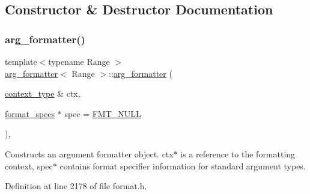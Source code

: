 \subsection{Constructor \& Destructor Documentation}
\mbox{\label{classarg__formatter_a487efe4918c55106464196727524057a}} 
\subsubsection{\texorpdfstring{arg\+\_\+formatter()}{arg\_formatter()}\hspace{0.1cm}{\footnotesize\ttfamily [1/2]}}
{\footnotesize\ttfamily template$<$typename Range $>$ \\
\hyperlink{classarg__formatter}{arg\+\_\+formatter}$<$ Range $>$\+::\hyperlink{classarg__formatter}{arg\+\_\+formatter} (\begin{DoxyParamCaption}\item[{\hyperlink{classbasic__format__context}{context\+\_\+type} \&}]{ctx,  }\item[{\hyperlink{classinternal_1_1arg__formatter__base_acff46f7da1afa536210eb77a2ea0d775}{format\+\_\+specs} $\ast$}]{spec = {\ttfamily \hyperlink{core_8h_af7f827e50dd7667484c279ac1d38f30b}{F\+M\+T\+\_\+\+N\+U\+LL}} }\end{DoxyParamCaption})\hspace{0.3cm}{\ttfamily [inline]}, {\ttfamily [explicit]}}

Constructs an argument formatter object. ctx$\ast$ is a reference to the formatting context, spec$\ast$ contains format specifier information for standard argument types.  

Definition at line 2178 of file format.\+h.

\mbox{\label{classarg__formatter_aeaee70db546c421ada9685b16b7a40c8}} 
